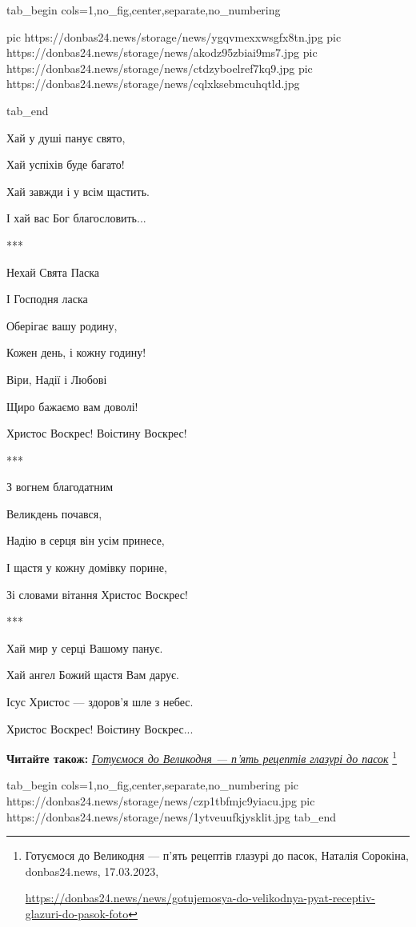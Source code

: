 \ifcmt
  tab_begin cols=1,no_fig,center,separate,no_numbering

     pic https://donbas24.news/storage/news/ygqvmexxwsgfx8tn.jpg
     pic https://donbas24.news/storage/news/akodz95zbiai9ms7.jpg
     pic https://donbas24.news/storage/news/ctdzyboelref7kq9.jpg
     pic https://donbas24.news/storage/news/cqlxksebmcuhqtld.jpg

  tab_end
\fi

Хай у душі панує свято,

Хай успіхів буде багато!

Хай завжди і у всім щастить.

І хай вас Бог благословить...

***

Нехай Свята Паска

І Господня ласка

Оберігає вашу родину,

Кожен день, і кожну годину!

Віри, Надії і Любові

Щиро бажаємо вам доволі!

Христос Воскрес! Воістину Воскрес!

***

З вогнем благодатним

Великдень почався,

Надію в серця він усім принесе,

І щастя у кожну домівку порине,

Зі словами вітання Христос Воскрес!

***

Хай мир у серці Вашому панує.

Хай ангел Божий щастя Вам дарує.

Ісус Христос — здоров'я шле з небес.

Христос Воскрес! Воістину Воскрес...

\textbf{Читайте також:} \href{https://donbas24.news/news/gotujemosya-do-velikodnya-pyat-receptiv-glazuri-do-pasok-foto}{\emph{Готуємося до Великодня — п'ять рецептів глазурі до пасок}}%
\footnote{Готуємося до Великодня — п'ять рецептів глазурі до пасок, Наталія Сорокіна, donbas24.news, 17.03.2023, \par%
\url{https://donbas24.news/news/gotujemosya-do-velikodnya-pyat-receptiv-glazuri-do-pasok-foto}%
}


\ifcmt
  tab_begin cols=1,no_fig,center,separate,no_numbering
     pic https://donbas24.news/storage/news/czp1tbfmjc9yiacu.jpg
     pic https://donbas24.news/storage/news/1ytveuufkjysklit.jpg
  tab_end
\fi

